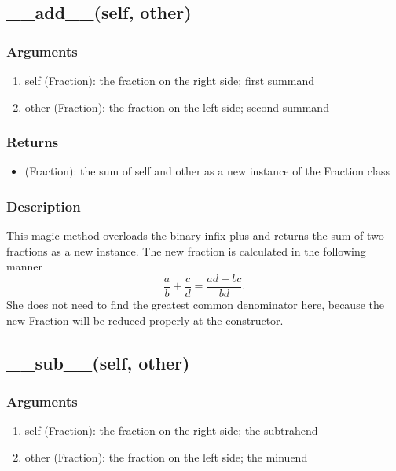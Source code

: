 \documentclass[refman]{scrartcl}
\begin{document}
\subsection{\_\_add\_\_(self, other)}

\subsubsection*{Arguments}

\begin{enumerate}
	\item self (Fraction): the fraction on the right side; first summand
	\item other (Fraction): the fraction on the left side; second summand
\end{enumerate}

\subsubsection*{Returns}

\begin{itemize}
	\item (Fraction): the sum of self and other as a new instance of the Fraction class
\end{itemize}

\subsubsection*{Description}

This magic method overloads the binary infix plus and returns the sum of two fractions as a new instance. The new fraction is calculated in the following manner
%
\begin{equation}
	\frac{a}{b} + \frac{c}{d} = \frac{ad + bc}{bd} \text{.}
\end{equation}
%
She does not need to find the greatest common denominator here, because the new Fraction will be reduced properly at the constructor.

\subsection{\_\_sub\_\_(self, other)}

\subsubsection*{Arguments}

\begin{enumerate}
	\item self (Fraction): the fraction on the right side; the subtrahend
	\item other (Fraction): the fraction on the left side; the minuend
\end{enumerate}
\end{document}
